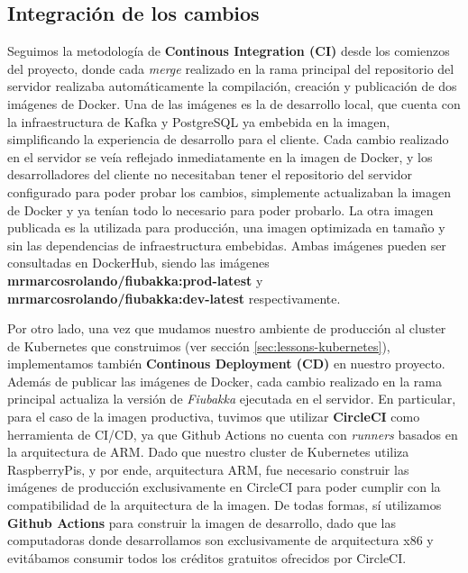 \subsection{Integración de los cambios}

\noindent Seguimos la metodología de \textbf{Continous Integration (CI)} desde los comienzos del proyecto, donde cada \textit{merge} realizado en la rama principal
del repositorio del servidor realizaba automáticamente la compilación, creación y publicación de dos imágenes de Docker. Una de las imágenes es la de desarrollo local, que cuenta
con la infraestructura de Kafka y PostgreSQL ya embebida en la imagen, simplificando la experiencia de desarrollo para el cliente. Cada cambio realizado en el servidor se veía reflejado
inmediatamente en la imagen de Docker, y los desarrolladores del cliente no necesitaban tener el repositorio del servidor configurado para poder probar los cambios, simplemente actualizaban la
imagen de Docker y ya tenían todo lo necesario para poder probarlo. La otra imagen publicada es la utilizada para producción, una imagen optimizada en tamaño y sin las dependencias de infraestructura
embebidas. Ambas imágenes pueden ser consultadas en DockerHub, siendo las imágenes \textbf{mrmarcosrolando/fiubakka:prod-latest} y \textbf{mrmarcosrolando/fiubakka:dev-latest} respectivamente.

Por otro lado, una vez que mudamos nuestro ambiente de producción al cluster de Kubernetes que construimos (ver sección \ref{sec:lessons-kubernetes}), implementamos también \textbf{Continous Deployment (CD)} en nuestro proyecto.
Además de publicar las imágenes de Docker, cada cambio realizado en la rama principal actualiza la versión de \textit{Fiubakka} ejecutada en el servidor. En particular, para el caso de la imagen productiva,
tuvimos que utilizar \textbf{CircleCI} como herramienta de CI/CD, ya que Github Actions no cuenta con \textit{runners} basados en la arquitectura de ARM. Dado que nuestro cluster de Kubernetes utiliza
RaspberryPis, y por ende, arquitectura ARM, fue necesario construir las imágenes de producción exclusivamente en CircleCI para poder cumplir con la compatibilidad de la arquitectura de la imagen. De todas formas, sí utilizamos
\textbf{Github Actions} para construir la imagen de desarrollo, dado que las computadoras donde desarrollamos son exclusivamente de arquitectura x86 y evitábamos consumir todos los créditos gratuitos ofrecidos por CircleCI.

